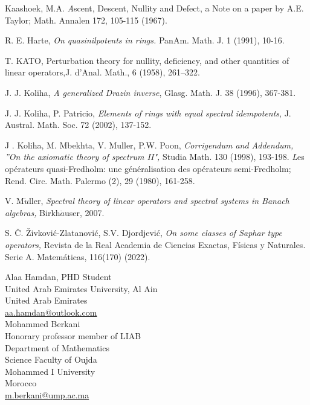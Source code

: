 \documentclass[10pt]{article}
\numberwithin{equation}{section}
\begin{document}
\begin{thebibliography}{5}
  Kaashoek, M.A.  {\textit Ascent, Descent, Nullity
and Defect, a Note on a paper by A.E. Taylor;}
 Math. Annalen 172, 105-115  (1967). 

 R. E. Harte, { \em On quasinilpotents in rings.} PanAm.
Math. J. 1 (1991), 10-16.

 T. KATO, Perturbation theory for nullity, deficiency, and other quantities of linear operators,J. d'Anal. Math., 6 (1958), 261–322.

 J. J. Koliha, \textit{A generalized Drazin inverse}, Glasg. Math. J. 38 (1996),
367-381.




 J. J. Koliha, P. Patricio, \textit{Elements of rings
 with equal spectral idempotents},
J. Austral. Math. Soc. 72 (2002), 137-152.

 J . Koliha, M. Mbekhta, V. Muller, P.W. Poon, \textit{Corrigendum and
Addendum, ''On the axiomatic theory of spectrum II",} Studia Math. 130
(1998), 193-198.
  {\textit Les op\'erateurs
quasi-Fredholm: une g\'en\'eralisation des op\'erateurs
semi-Fredholm;} Rend. Circ. Math. Palermo (2), 29 (1980),
161-258.



 V. M$\ddot{u}$ller, \textit{Spectral theory of linear operators and spectral systems in Banach algebras,}
Birkh$\ddot{a}$user, 2007.

 S. \v{C}. \v{Z}ivkovi\'c-Zlatanovi\'c, S.V. Djordjevi\'c, \textit {On some classes of Saphar type operators,} Revista de la Real Academia de Ciencias Exactas, F\'isicas y Naturales. Serie A. Matem\'aticas, 116(170) (2022).





\end{thebibliography}


\noindent  Alaa Hamdan, PHD Student\\
\noindent  United Arab Emirates University, Al Ain\\
\noindent   United Arab Emirates \\
\noindent   \href{mailto:aa.hamdan@outlook.com }{aa.hamdan@outlook.com}\\



\noindent  Mohammed Berkani\\
\noindent Honorary professor member of LIAB \\
\noindent Department of Mathematics\\
\noindent Science Faculty of Oujda \\
\noindent Mohammed I University\\
\noindent Morocco\\
\noindent \href{mailto:m.berkani@ump.ac.ma}{m.berkani@ump.ac.ma}
\end{document}
